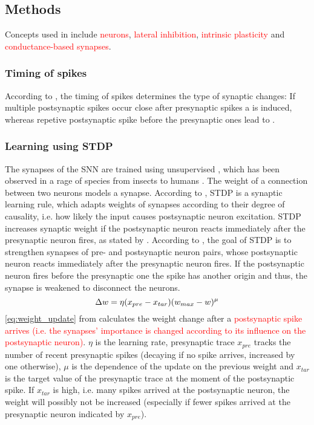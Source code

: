 \subsection{Methods}
\label{subsec:methods}

Concepts used in \cite{SNN} include \textcolor{red}{ neurons}, \textcolor{red}{lateral inhibition}, \textcolor{red}{intrinsic plasticity} and \textcolor{red}{conductance-based synapses}.

\subsubsection{Timing of spikes}
According to \cite{LTP_D_bio}, the timing of spikes determines the type of synaptic changes:
If multiple postsynaptic spikes occur close after presynaptic spikes a  is induced, 
whereas repetive postsynaptic spike before the presynaptic ones lead to .


\subsubsection{Learning using \ac{STDP}}
The synapses of the \ac{SNN} are trained using unsupervised , which has been observed in a rage of species from insects to humans \cite{STDP_hebbian}. 
The weight of a connection between two neurons models a synapse.
According to \cite{STDP_like}, \ac{STDP} is a synaptic learning rule, which adapts weights of synapses according to their degree of causality, i.e. how likely the input causes postsynaptic neuron excitation.
\ac{STDP} increases synaptic weight if the postsynaptic neuron reacts immediately after the presynaptic neuron fires, as stated by \cite{object_detection_SNN}.
According to \cite{object_detection_SNN}, the goal of \ac{STDP} is to strengthen synapses of pre- and postsynaptic neuron pairs, whose postsynaptic neuron reacts immediately after the presynaptic neuron fires.
If the postsynaptic neuron fires before the presynaptic one the spike has another origin and thus, the synapse is weakened to disconnect the neurons.
%
\begin{equation}
    \centering
    \label{eq:weight_update}
    \Delta w = \eta (x_{pre} - x_{tar})(w_{max}-w)^\mu
\end{equation}
%
\autoref{eq:weight_update} from \cite{SNN} calculates the weight change after a \textcolor{red}{postsynaptic spike arrives (i.e. the synapses' importance is changed according to its influence on the postsynaptic neuron)}.
$\eta$ is the learning rate, presynaptic trace $x_{pre}$ tracks the number of recent presynaptic spikes (decaying if no spike arrives, increased by one otherwise), $\mu$ is the dependence of the update on the previous weight and $x_{tar}$ is the target value of the presynaptic trace at the moment of the postsynaptic spike.
If $x_{tar}$ is high, i.e. many spikes arrived at the postsynaptic neuron, the weight will possibly not be increased (especially if fewer spikes arrived at the presynaptic neuron indicated by  $x_{pre}$).

